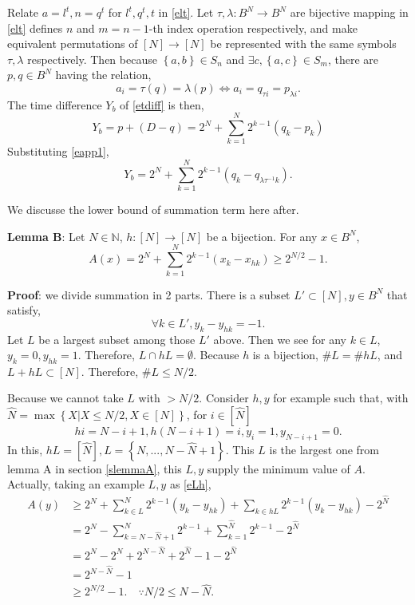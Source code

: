 \documentclass[a4paper]{article}
\newcommand{\eqlabel}[1]{\label{#1}}
\newcommand{\cbr}[1]{\left\{#1\right\}}
\newcommand{\sN}{\mathbb{N}}
\begin{document}
Relate \(a = l^t, n = q^t\) for \(l^t, q^t, t\) in \eqref{elt}. Let \(\tau, \lambda: B^N\to B^N\) are bijective mapping in \eqref{elt} defines \(n\) and \(m=n-1\)-th index operation respectively,  and make equivalent permutations of \([N]\to [N]\) be represented with the same symbols \(\tau, \lambda\) respectively. Then because \(\cbr{a, b}\in S_n\) and \(\exists c, \cbr{a, c}\in S_m\), there are \(p, q\in B^N\) having the relation,
\begin{equation}
    \eqlabel{eapp1}
 a_i = \tau(q) = \lambda(p) \Leftrightarrow a_i = q_{\tau i} = p_{\lambda i}. 
\end{equation}
The time difference \(Y_b\) of \eqref{etdiff} is then,
\[
Y_b = p + (D - q) = 2^{N} + \sum_{k=1}^N 2^{k-1}(q_k - p_k)
\]
Substituting \eqref{eapp1},
\[
Y_b = 2^{N} + \sum_{k=1}^N 2^{k-1}(q_k - q_{\lambda \tau^{-1} k}) .
\]

We discusse the lower bound of summation term here after.

\textbf{Lemma B}: Let \(N\in\sN\), \(h:[N]\to [N]\) be a bijection. For any \(x\in B^N\), 
\begin{equation}
\eqlabel{eLB}
A(x) = 2^N + \sum_{k=1}^N 2^{k-1} (x_k - x_{hk}) \geq 2^{N/2 } - 1.
\end{equation}

\textbf{Proof}: we divide summation in 2 parts. There is a subset \(L'\subset[N], y\in B^N\) that satisfy,
\[
    \forall k\in L', y_k - y_{h k} = -1.
\] 
Let \(L\) be a largest subset among those \(L'\) above. 
Then we see for any \(k\in L\), \(y_k = 0, y_{hk} = 1\). Therefore, \(L \cap h L = \emptyset\). Because \(h\) is a bijection, \(\# L = \# hL\), and \(L + h L \subset [N]\). Therefore, \(\# L \leq N/2\). 

Because we cannot take \(L\) with \(> N/2\). Consider \(h, y\) for example such that, with \(\hat{N} = \max \cbr{X| X \leq N/2, X\in [N]}\), for \(i \in[\hat{N}]\)
\begin{equation}
    \eqlabel{eLh}
    hi = N-i+1,  h (N-i+1) =i, y_i = 1, y_{N-i+1} = 0.
\end{equation}
In this, \(hL = [\hat{N}], L = \cbr{N,...,N-\hat{N}+1}\). This \(L\) is the largest one from lemma A in section \ref{slemmaA}, this \(L, y\) supply the minimum value of \(A\). Actually, taking an example \(L, y\) as \eqref{eLh}, 
\begin{align*}
A(y) &\geq 2^N + \sum_{k\in L}^N 2^{k-1} (y_k - y_{hk})  + \sum_{k\in hL}2^{k-1}(y_k - y_{hk}) - 2^{\hat{N}} \\
&= 2^N - \sum_{k=N-\hat{N}+1}^{N} 2^{k-1}  + \sum_{k=1}^{\hat{N}} 2^{k-1} - 2^{\hat{N}}\\
&= 2^N - 2^{N} + 2^{N-\hat{N}} + 2^{\hat{N}} - 1 - 2^{\hat{N}}\\
&= 2^{N-\hat{N}}  - 1\\
&\geq 2^{N/2}  - 1. \quad\because N/2 \leq N- \hat{N}.
\end{align*}
\end{document}
